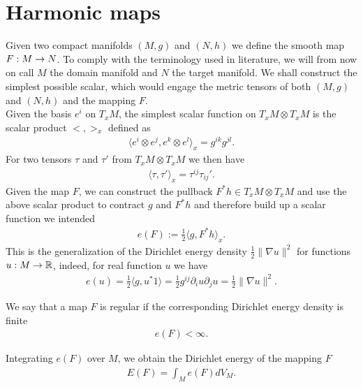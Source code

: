\section{Harmonic maps}
\label{sec:preliminaries}

Given two compact manifolds $(M,g)$ and $(N,h)$ we define the smooth
map $F:M\rightarrow N$. To comply with the terminology used in literature, we
will from now on call $M$ the domain manifold and $N$ the target
manifold. We shall construct the simplest possible scalar,
which would engage the metric tensors of both $(M,g)$ and $(N,h)$ and the mapping $F$.\\
Given the basis $e^i$ on $T_x M$, the simplest scalar function on $T_x
M\otimes T_x M$ is the scalar product $<,>_x$ defined as
\begin{align}
  \label{eq:1}
  \langle e^i\otimes e^j,e^k\otimes e^l\rangle_x=g^{ik}g^{jl}.
\end{align}
For two tensors $\tau$ and $\tau'$ from $T_x M\otimes T_x M$ we then
have
\begin{align}
  \label{eq:2}
  \langle\tau,\tau'\rangle_x=\tau^{ij}\tau_{ij}'.
\end{align}
Given the map $F$, we can construct the pullback $F^*h\in T_x M\otimes
T_x M$ and use the above scalar product to contract $g$ and $F^* h$
and therefore build up a scalar function we intended
\begin{align}
  \label{eq:3}
  e(F):=\frac{1}{2}\langle g,F^*h\rangle_x.
\end{align}
This is the generalization of the Dirichlet energy density
$\frac{1}{2}\lVert\nabla u\rVert^2$ for functions $u:M\rightarrow\mathbb{R}$,
indeed, for real function $u$ we have
\begin{align}
  \label{eq:4}
  e(u)=\frac{1}{2}\langle g,u^*1\rangle=\frac{1}{2}g^{ij}\partial_i u\partial_j u
  =\frac{1}{2}\lVert\nabla u\rVert^2.
\end{align}

\begin{definition}\label{def:regular-map}
  We say that a map $F$ is regular if the corresponding Dirichlet
  energy density is finite
  \begin{align}
    \label{eq:5}
    e(F)<\infty.
  \end{align}
\end{definition}

Integrating $e(F)$ over $M$, we obtain the Dirichlet energy of the
mapping $F$
\begin{align}\label{eq:6}
  E(F)=\int_M e(F)dV_M.
\end{align}

